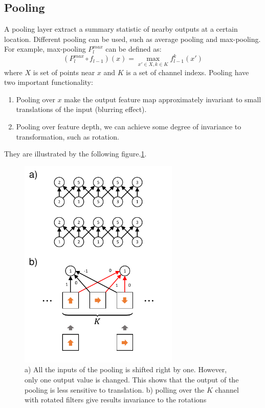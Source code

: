 \documentclass{IEEEtran}
\begin{document}
\subsection*{Pooling}
A pooling layer extract a summary statistic of nearby outputs at a certain location. Different pooling can be 
used, such as average pooling and max-pooling. For example, max-pooling $P^{max}_l$ can be defined as:
\begin{equation}
    (P^{max}_l \circ f_{l-1}) (x) = \max_{x' \in X, k \in K} f_{l-1}^k(x')
\end{equation}
where $X$ is set of points near $x$ and $K$ is a set of channel indexs.
Pooling have two important functionality:
\begin{enumerate}
    \item Pooling over $x$ make the output feature map approximately invariant to small translations of the input (blurring effect).
    \item Pooling over feature depth, we can achieve some degree of invariance to transformation, such as rotation.
\end{enumerate}
They are illustrated 
by the following figure.\ref{F:pooling}.
\begin{figure}[h!]
    \centering
    \includegraphics[width=3in]{figures/pooling.pdf}
    \caption{a) All the inputs of the pooling is shifted right by one. However, only one output value is changed. This shows that the output
            of the pooling is less sensitive to translation. 
            b) polling over the $K$ channel with rotated filters give results invariance to the rotations}
    \label{F:pooling}
\end{figure}
\end{document}
